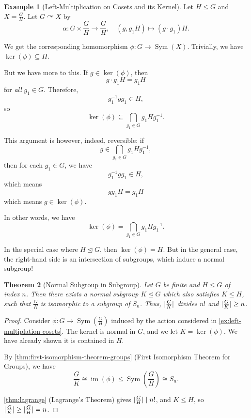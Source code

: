 \documentclass{article}
\newtheorem{theorem}{Theorem}[section]
\theoremstyle{definition}
\newtheorem{example}[theorem]{Example}
\theoremstyle{remark}
\DeclarePairedDelimiter{\abs}{\lvert}{\rvert}
\newcommand{\pqty}[1]{\left(#1\right)}
\newcommand{\flatfrac}[2]{\frac{#1}{#2}}
\newcommand{\functiondomain}[3]{#1:#2\to #3}
\newcommand{\function}[5]{#1:#2\to #3,\quad #4\mapsto #5}
\newcommand{\inverse}{^{-1}}
\newcommand{\isomorphic}{\cong}
\newcommand{\normalsub}{\trianglelefteq}
\newcommand{\subgroup}{\leq}
\newcommand{\actson}{\curvearrowright}
\newcommand{\divides}{\mid}
\newcommand{\Sym}{\operatorname{Sym}}
\newcommand{\img}{\operatorname{im}}
\begin{document}
\begin{example}[Left-Multiplication on Cosets and its Kernel]
    \label{ex:left-multiplation-cosets}%
    Let \(H \subgroup G\) and \(X = \flatfrac{G}{H}\). Let \(G \actson X\) by
    \[
        \function{\alpha}{G \times \flatfrac{G}{H}}{\flatfrac{G}{H}}{\pqty{g, g_1 H}}{\pqty{g \cdot g_1} H}.
    \]

    We get the corresponding homomorphism \(\functiondomain{\phi}{G}\Sym\pqty{X}\). Trivially, we have \(\ker\pqty{\phi} \subseteq H\).

    But we have more to this. If \(g \in \ker \pqty{\phi}\), then
    \[
        g \cdot g_1 H = g_1 H
    \]
    for \emph{all} \(g_1 \in G\). Therefore,
    \[
        g_1 \inverse g g_1 \in H,
    \]
    so
    \[
        \ker\pqty{\phi} \subseteq \bigcap_{g_1 \in G} g_1 H g_1 \inverse.
    \]

    This argument is however, indeed, reversible: if
    \[
        g \in \bigcap_{g_1 \in G} g_1 H g_1 \inverse,
    \]
    then for each \(g_1 \in G\), we have
    \[
        g_1 \inverse g g_1 \in H,
    \]
    which means
    \[
        g g_1 H = g_1 H
    \]
    which means \(g \in \ker\pqty{\phi}\).

    In other words, we have
    \[
        \ker\pqty{\phi} = \bigcap_{g_1 \in G} g_1 H g_1 \inverse.
    \]

    In the special case where \(H \normalsub G\), then \(\ker\pqty{\phi} = H\). But in the general case, the right-hand side is an intersection of subgroups, which induce a normal subgroup!
\end{example}

\begin{theorem}[Normal Subgroup in Subgroup]
    \label{thm:normal-subgroup-contained-in-subgroup}%
    Let \(G\) be finite and \(H \subgroup G\) of index \(n\). Then there exists a normal subgroup \(K \normalsub G\) which also satisfies \(K \subgroup H\), such that \(\flatfrac{G}{K}\) is isomorphic to  a subgroup of \(S_n\). Thus, \(\abs{\flatfrac{G}{K}}\) divides \(n!\) and \(\abs{\flatfrac{G}{K}} \geq n\).
\end{theorem}

\begin{proof}
    Consider \(\functiondomain{\phi}{G}{\Sym\pqty{\flatfrac{G}{H}}}\) induced by the action considered in \autoref{ex:left-multiplation-cosets}. The kernel is normal in \(G\), and we let \(K = \ker \pqty{\phi}\). We have already shown it is contained in \(H\).

    By \autoref{thm:first-isomorphism-theorem-groups} (First Isomorphism Theorem for Groups), we have
    \[
        \flatfrac{G}{K} \isomorphic \img \pqty{\phi} \subgroup \Sym\pqty{\flatfrac{G}{H}} \isomorphic S_n.
    \]

    \autoref{thm:lagrange} (Lagrange's Theorem) gives \(\abs{\flatfrac{G}{H}} \divides n!\), and \(K \subgroup H\), so \(\abs{\flatfrac{G}{K}} \geq \abs{\flatfrac{G}{H}} = n\).
\end{proof}
\end{document}
